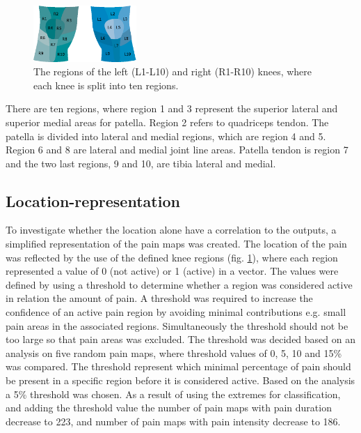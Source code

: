 \begin{figure} [H] 
\centering
\includegraphics[width=0.35\textwidth]{Figures/atlas}
\caption{The regions of the left (L1-L10) and right (R1-R10) knees, where each knee is split into ten regions.}
\label{fig:atlas}
\end{figure}

\noindent 
There are ten regions, where region 1 and 3 represent the superior lateral and superior medial areas for patella. Region 2 refers to quadriceps tendon. The patella is divided into lateral and medial regions, which are region 4 and 5. Region 6 and 8 are lateral and medial joint line areas. Patella tendon is region 7 and the two last regions, 9 and 10, are tibia lateral and medial.\citep{Elson2010}

\subsection*{\textbf{Location-representation}} 
\noindent
To investigate whether the location alone have a correlation to the outputs, a simplified representation of the pain maps was created. The location of the pain was reflected by the use of the defined knee regions (fig. \ref{fig:atlas}), where each region represented a value of 0 (not active) or 1 (active) in a vector.  The values were defined by using a threshold to determine whether a region was considered active in relation the amount of pain. A threshold was required to increase the confidence of an active pain region by avoiding minimal contributions e.g. small pain areas in the associated regions. Simultaneously the threshold should not be too large so that pain areas was excluded. The threshold was decided based on an analysis on five random pain maps, where threshold values of 0, 5, 10 and 15\% was compared. The threshold represent which minimal percentage of pain should be present in a specific region before it is considered active. Based on the analysis a 5\% threshold was chosen. As a result of using the extremes for classification, and adding the threshold value the number of pain maps with pain duration decrease to 223, and number of pain maps with pain intensity decrease to 186.  

